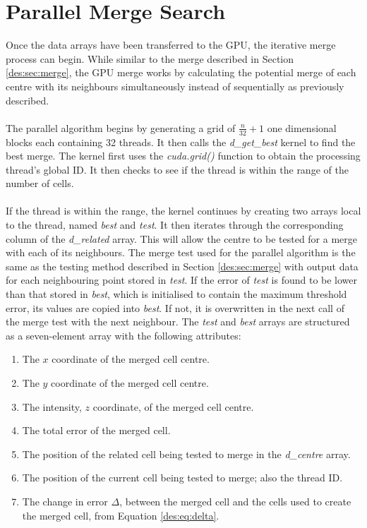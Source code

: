 \section{Parallel Merge Search}
Once the data arrays have been transferred to the GPU, the iterative merge process can begin. While similar to the merge described in Section \ref{des:sec:merge}, the GPU merge works by calculating the potential merge of each centre with its neighbours simultaneously instead of sequentially as previously described.
\\
\\
The parallel algorithm begins by generating a grid of $\frac{n}{32}+1$ one dimensional blocks each containing 32 threads. It then calls the \textit{d\_get\_best} kernel to find the best merge. The kernel first uses the \textit{cuda.grid()} function to obtain the processing thread's global ID. It then checks to see if the thread is within the range of the number of cells.
\\
\\
If the thread is within the range, the kernel continues by creating two arrays local to the thread, named \textit{best} and \textit{test}. It then iterates through the corresponding column of the \textit{d\_related} array. This will allow the centre to be tested for a merge with each of its neighbours. The merge test used for the parallel algorithm is the same as the testing method described in Section \ref{des:sec:merge} with output data for each neighbouring point stored in \textit{test}. If the error of \textit{test} is found to be lower than that stored in \textit{best}, which is initialised to contain the maximum threshold error, its values are copied into \textit{best}. If not, it is overwritten in the next call of the merge test with the next neighbour. The \textit{test} and \textit{best} arrays are structured as a seven-element array with the following attributes:
\begin{enumerate}
\item The $x$ coordinate of the merged cell centre.
\item The $y$ coordinate of the merged cell centre.
\item The intensity, $z$ coordinate, of the merged cell centre.
\item The total error of the merged cell.
\item The position of the related cell being tested to merge in the \textit{d\_centre} array.
\item The position of the current cell being tested to merge; also the thread ID.
\item The change in error $\Delta$, between the merged cell and the cells used to create the merged cell, from Equation \ref{des:eq:delta}.
\end{enumerate}
